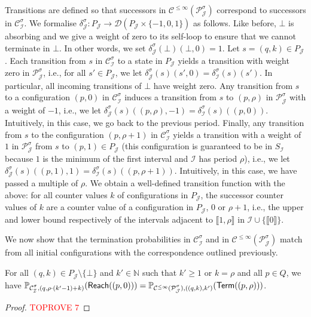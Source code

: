 \documentclass[a4paper,UKenglish,cleveref,autoref,thm-restate,colorlinks]{lipics-v2021}
\newcommand{\integerInterval}[1]{\llbracket{}#1\rrbracket{}}
\newcommand{\IN}{\mathbb{N}}
\newcommand{\dist}[1]{\mathcal{D}(#1)}
\newcommand{\mdpStateSpace}{S}
\newcommand{\mdpTrans}{\delta}
\newcommand{\ocStateSpace}{Q}
\newcommand{\ocState}{q}
\newcommand{\ocStateB}{p}
\newcommand{\ocCount}{k}
\newcommand{\ocCountB}{k'}
\newcommand{\ocConfig}{s}
\newcommand{\ocTrans}{\delta}
\newcommand{\period}{\rho}
\newcommand{\mchain}{\mathcal{C}}
\newcommand{\ocChain}{\mathcal{P}}
\newcommand{\ocChainFin}[2]{\mchain^{\leq #2}(#1)}
\newcommand{\intPart}{\mathcal{I}}
\newcommand{\intPartB}{\mathcal{J}}
\newcommand{\compressChainStrat}[1]{\mchain^{#1}_{\intPart}}
\newcommand{\compressChain}{\compressChainStrat{\strat}}
\newcommand{\compressChainStateSpace}{\mdpStateSpace_{\intPart}}
\newcommand{\compressChainTransTemplate}[2]{\mdpTrans^{#1}_{#2}}
\newcommand{\compressChainTrans}{\compressChainTransTemplate{\strat}{\intPart}}
\newcommand{\cisChainStrat}[1]{\ocChain^{#1}_{\intPartB}}
\newcommand{\cisChain}{\cisChainStrat{\strat}}
\newcommand{\cisChainStateSpace}{P_{\intPartB}}
\newcommand{\cisChainTransTemplate}[2]{\ocTrans_{#1}^{#2}}
\newcommand{\cisChainTrans}{\cisChainTransTemplate{\intPartB}{\strat}}
\newcommand{\reach}[1]{\mathsf{Reach}(#1)}
\newcommand{\termination}{\mathsf{Term}}
\newcommand{\selectiveTermination}[1]{\termination({#1})}
\newcommand{\stratGeneric}[1]{{\sigma_{#1}}}
\newcommand{\strat}{\stratGeneric{}}
\begin{document}
Transitions are defined so that successors in $\ocChainFin{\cisChain}{\infty}$ correspond to successors in $\compressChain$.
We formalise $\cisChainTrans\colon\cisChainStateSpace\to\dist{\cisChainStateSpace\times\{-1, 0, 1\}}$ as follows.
Like before, $\bot$ is absorbing and we give a weight of zero to its self-loop to ensure that we cannot terminate in $\bot$.
In other words, we set $\cisChainTrans(\bot)(\bot, 0)=1$.
Let $\ocConfig=(\ocState, \ocCount)\in\cisChainStateSpace$.
Each transition from $\ocConfig$ in $\compressChain$ to a state in $\cisChainStateSpace$ yields a transition with weight zero in $\cisChain$, i.e., for all $\ocConfig'\in\cisChainStateSpace$, we let $\cisChainTrans(\ocConfig)(\ocConfig', 0) = \compressChainTrans(\ocConfig)(\ocConfig')$.
In particular, all incoming transitions of $\bot$ have weight zero.
Any transition from $\ocConfig$ to a configuration $(\ocStateB, 0)$ in $\compressChain$ induces a transition from $\ocConfig$ to $(\ocStateB, \period)$ in $\cisChain$ with a weight of $-1$, i.e., we let $\cisChainTrans(\ocConfig)((\ocStateB, \period), -1) = \compressChainTrans(\ocConfig)((\ocStateB, 0))$.
Intuitively, in this case, we go back to the previous period.
Finally, any transition from $\ocConfig$ to the configuration $(\ocStateB, \period+1)$ in $\compressChain$ yields a transition with a weight of $1$ in $\cisChain$ from $\ocConfig$ to $(\ocStateB, 1)\in\cisChainStateSpace$ (this configuration is guaranteed to be in $\compressChainStateSpace$ because $1$ is the minimum of the first interval and $\intPart$ has period $\period$), i.e., we let $\cisChainTrans(\ocConfig)((\ocStateB, 1), 1) = \compressChainTrans(\ocConfig)((\ocStateB, \period+1))$.
Intuitively, in this case, we have passed a multiple of $\period$.
We obtain a well-defined transition function with the above: for all counter values $\ocCount$ of configurations in $\cisChainStateSpace$, the successor counter values of $\ocCount$ are a counter value of a configuration in $\cisChainStateSpace$, $0$ or $\period+1$, i.e., the upper and lower bound respectively of the intervals adjacent to $\integerInterval{1, \period}$ in $\intPart\cup\{\integerInterval{0}\}$.

We now show that the termination probabilities in $\compressChain$ and in $\ocChainFin{\cisChain}{\infty}$ match from all initial configurations with the correspondence outlined previously.

\begin{theorem}\label{theorem:cis:compression:ocmc}
  For all $(\ocState, \ocCount)\in\cisChainStateSpace\setminus\{\bot\}$ and $\ocCountB\in\IN$ such that $\ocCountB\geq1$ or $\ocCount=\period$ and all $\ocStateB\in\ocStateSpace$, we have $\probaMCverb{\compressChain}{(\ocState, \period\cdot(\ocCount'-1)+\ocCount)}(\reach{(\ocStateB, 0)}) = \probaMCverb{\ocChainFin{\cisChain}{\infty}}{((\ocState, \ocCount), \ocCount')}(\selectiveTermination{(\ocStateB, \period)})$.
\end{theorem}
\begin{proof}\textcolor{red}{TOPROVE 7}\end{proof}
\end{document}
